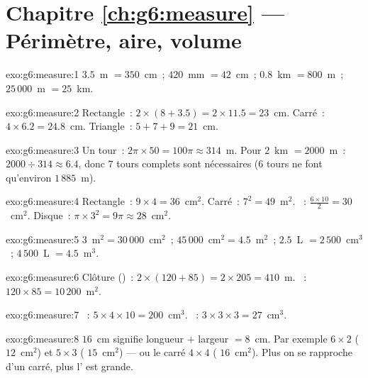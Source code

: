 \section*{Chapitre \ref{ch:g6:measure} --- Périmètre, aire, volume}

\begin{solution}{exo:g6:measure:1}
$3.5$~m $= 350$~cm~; \quad $420$~mm $= 42$~cm~; \quad
$0.8$~km $= 800$~m~; \quad $25\,000$~m $= 25$~km.
\end{solution}

\begin{solution}{exo:g6:measure:2}
Rectangle~: $2 \times (8 + 3.5) = 2 \times 11.5 = 23$~cm.
Carré~: $4 \times 6.2 = 24.8$~cm.
Triangle~: $5 + 7 + 9 = 21$~cm.
\end{solution}

\begin{solution}{exo:g6:measure:3}
Un tour~: $2\pi \times 50 = 100\pi \approx 314$~m. Pour $2$~km
$= 2000$~m~: $2000 \div 314 \approx 6.4$, donc $7$ tours complets
sont nécessaires ($6$ tours ne font qu'environ $1\,885$~m).
\end{solution}

\begin{solution}{exo:g6:measure:4}
Rectangle~: $9 \times 4 = 36$~cm$^2$. Carré~: $7^2 = 49$~m$^2$.
~: $\frac{6 \times 10}{2} = 30$~cm$^2$.
Disque~: $\pi \times 3^2 = 9\pi \approx 28$~cm$^2$.
\end{solution}

\begin{solution}{exo:g6:measure:5}
$3$~m$^2 = 30\,000$~cm$^2$~; \quad
$45\,000$~cm$^2 = 4.5$~m$^2$~; \quad
$2.5$~L $= 2\,500$~cm$^3$~; \quad
$4\,500$~L $= 4.5$~m$^3$.
\end{solution}

\begin{solution}{exo:g6:measure:6}
Clôture ()~: $2 \times (120 + 85) = 2 \times 205 = 410$~m.
~: $120 \times 85 = 10\,200$~m$^2$.
\end{solution}

\begin{solution}{exo:g6:measure:7}
~: $5 \times 4 \times 10 = 200$~cm$^3$. ~:
$3 \times 3 \times 3 = 27$~cm$^3$.
\end{solution}

\begin{solution}{exo:g6:measure:8}
 $16$~cm signifie longueur $+$ largeur $= 8$~cm. Par
exemple $6 \times 2$ ( $12$~cm$^2$) et $5 \times 3$ (
$15$~cm$^2$) --- ou le carré $4 \times 4$ ( $16$~cm$^2$). Plus
on se rapproche d'un carré, plus l' est grande.
\end{solution}

